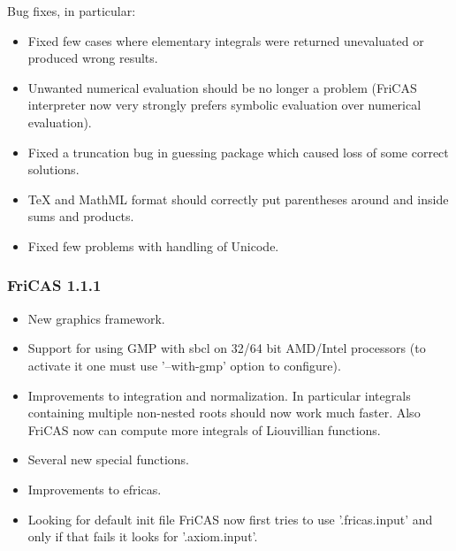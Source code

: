 Bug fixes, in particular:

\begin{itemize}
\item Fixed few cases where elementary integrals were returned
  unevaluated or produced wrong results.

\item Unwanted numerical evaluation should be no longer a problem
  (FriCAS interpreter now very strongly prefers symbolic evaluation
  over numerical evaluation).

\item Fixed a truncation bug in guessing package which caused loss of
  some correct solutions.

\item TeX and MathML format should correctly put parentheses around
  and inside sums and products.

\item Fixed few problems with handling of Unicode.
\end{itemize}

\subsubsection{FriCAS 1.1.1}

\begin{itemize}
\item New graphics framework.

\item Support for using GMP with sbcl on 32/64 bit AMD/Intel
  processors (to activate it one must use '--with-gmp' option to
  configure).

\item Improvements to integration and normalization. In particular
  integrals containing multiple non-nested roots should now work much
  faster. Also FriCAS now can compute more integrals of Liouvillian
  functions.

\item Several new special functions.

\item Improvements to efricas.

\item Looking for default init file FriCAS now first tries to use
  '.fricas.input' and only if that fails it looks for '.axiom.input'.
\end{itemize}

